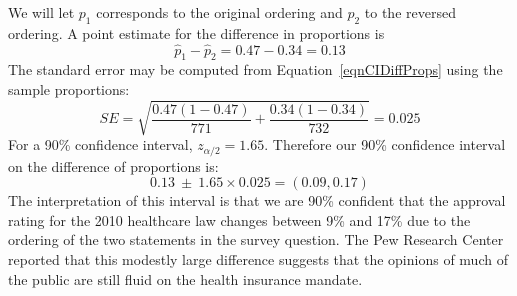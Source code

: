 We will let
$p_1$ corresponds to the original ordering and $p_2$ to the reversed ordering.
A point estimate for the difference in proportions is
\begin{equation*}
\hat{p}_{1} - \hat{p}_{2} = 0.47 - 0.34 = 0.13
\end{equation*}
The standard error may be computed from Equation~\eqref{eqnCIDiffProps}%
using the sample proportions:
\begin{equation*}
SE = \sqrt{\frac{0.47(1-0.47)}{771} + \frac{0.34(1-0.34)}{732}} = 0.025
\end{equation*}
For a 90\% confidence interval, $z_{\alpha/2} = 1.65$.
Therefore our 90\% confidence interval on the difference of proportions is:
\begin{equation*}
0.13 \ \pm\ 1.65 \times  0.025 = (0.09, 0.17)
\end{equation*}
The interpretation of this interval is that 
we are 90\% confident that the approval rating for the 2010 healthcare law changes between 9\% and 17\% due to the ordering of the two statements in the survey question. The Pew Research Center reported that this modestly large difference suggests that the opinions of much of the public are still fluid on the health insurance mandate.


